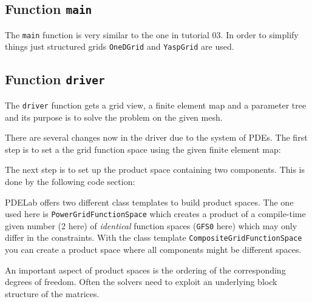 \documentclass[a4paper,12pt]{article}
\begin{document}
\subsection{Function \lstinline{main}}

The \lstinline{main} function is very similar to the one in tutorial 03.
In order to simplify things just structured grids \lstinline{OneDGrid}
and \lstinline{YaspGrid} are used.

\subsection{Function \lstinline{driver}}

The \lstinline{driver} function gets a grid view, a finite element
map and a parameter tree and its purpose is to solve the problem on
the given mesh.


There are several changes now in the driver due to the system of PDEs.
The first step is to set a the grid function space using the given finite
element map:


The next step is to set up the product space containing
two components. This is done by the following code section:

PDELab offers two different class templates to build product spaces. The
one used here is \lstinline{PowerGridFunctionSpace} which creates
a product of a compile-time given number (2 here)
of \textit{identical} function spaces (\lstinline{GFS0} here)
which may only differ in the constraints. With the 
class template \lstinline{CompositeGridFunctionSpace} you can create
a product space where all components might be different spaces. 

An important aspect of product spaces is the ordering of the corresponding degrees 
of freedom. Often the solvers need to exploit an underlying block structure
of the matrices. 
\end{document}
